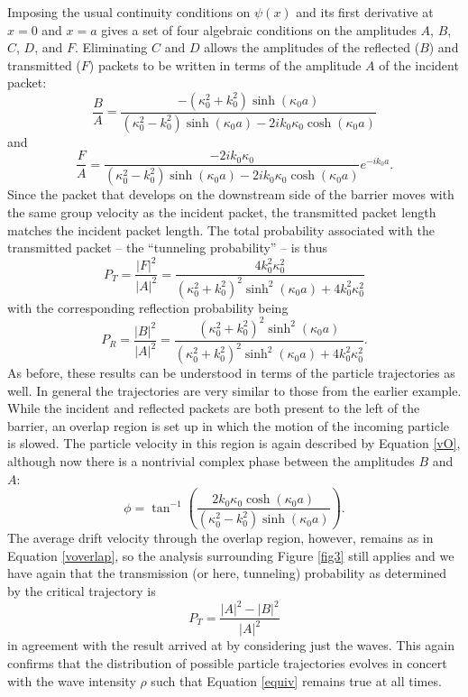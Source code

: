 \documentclass[aps,prc,onecolumn,letterpaper,floatfix,12pt]{revtex4}
\begin{document}
Imposing the usual continuity conditions on $\psi(x)$ and its first
derivative at $x=0$ and $x=a$ gives a set of four algebraic conditions
on the amplitudes $A$, $B$, $C$, $D$, and $F$.  Eliminating $C$ and
$D$ allows the amplitudes of the reflected ($B$) and transmitted ($F$)
packets to be written in terms of the amplitude $A$ of the incident
packet:
\begin{equation}
\frac{B}{A} = \frac{ - (\kappa_0^2 + k_0^2) \sinh(\kappa_0 a)
}{(\kappa_0^2 - k_0^2) \sinh(\kappa_0 a) - 2 i k_0 \kappa_0
  \cosh(\kappa_0 a)}
\label{tunnelBA}
\end{equation}
and
\begin{equation}
\frac{F}{A} = \frac{-2i k_0 \kappa_0}{(\kappa_0^2 - k_0^2)
  \sinh(\kappa_0 a) - 2 i k_0 \kappa_0 \cosh(\kappa_0 a)} e^{-i k_0 a}.
\end{equation}
Since the packet that develops on the downstream side of the barrier
moves with the same group velocity as the incident packet, the
transmitted packet length matches the incident packet length.  The
total probability associated with the transmitted packet -- the
``tunneling probability'' -- is thus
\begin{equation}
P_T = \frac{|F|^2}{|A|^2} = \frac{4 k_0^2
  \kappa_0^2}{(\kappa_0^2+k_0^2)^2 \sinh^2(\kappa_0 a) + 4 k_0^2 \kappa_0^2}
\end{equation}
with the corresponding reflection probability being
\begin{equation}
P_R = \frac{|B|^2}{|A|^2} = \frac{ (\kappa_0^2 + k_0^2)^2
  \sinh^2(\kappa_0 a) }{(\kappa_0^2 + k_0^2)^2
  \sinh^2(\kappa_0 a)+ 4 k_0^2 \kappa_0^2}.
\end{equation}
As before, these results can be understood in terms of the particle
trajectories as well.  In general the trajectories are very similar to
those from the earlier example.  While the incident and reflected
packets are both present to the left of the barrier, an overlap region 
is set up in which the motion of the incoming particle is slowed.
The particle velocity in this region is again described by Equation
\eqref{vO}, although now there is a nontrivial complex phase between
the amplitudes $B$ and $A$:
\begin{equation}
\phi = \tan^{-1}\left( \frac{ 2 k_0 \kappa_0 \cosh(\kappa_0 a)
  }{(\kappa_0^2-k_0^2) \sinh(\kappa_0 a) } \right).
\end{equation}
The average drift velocity through the overlap region, however,
remains as in Equation \eqref{voverlap}, so the analysis surrounding
Figure \ref{fig3} still applies and we have again that the
transmission (or here, tunneling) probability as determined by the
critical trajectory is
\begin{equation}
P_T = \frac{|A|^2 - |B|^2}{|A|^2}
\end{equation}
in agreement with the result arrived at by considering just the
waves.  This again confirms that the distribution of possible particle
trajectories evolves in concert with the wave intensity $\rho$ such
that Equation \eqref{equiv} remains true at all times.  
\end{document}
